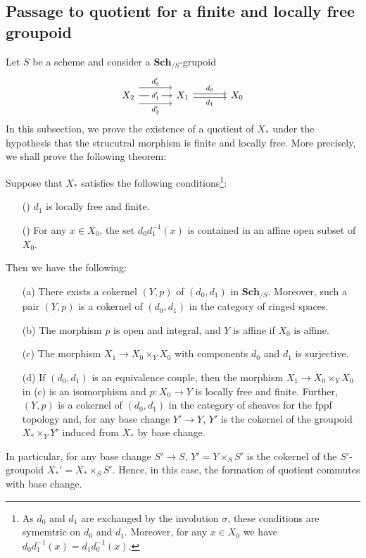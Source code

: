 \subsection{Passage to quotient for a finite and locally free groupoid}
Let $S$ be a scheme and consider a $\mathbf{Sch}_{/S}$-grupoid 
\[\begin{tikzcd}[column sep=12mm]
X_2\ar[r,shift left=8pt,"d_0'"]\ar[r,shift right=8pt,swap,"d_2'"]\ar[r,"d_1'"description]&X_1\ar[r,shift left=2pt,"d_0"]\ar[r,shift right=2pt,swap,"d_1"]&X_0
\end{tikzcd}\]
In this subsection, we prove the existence of a quotient of $X_*$ under the hypothesis that the strucutral morphism is finite and locally free. More precisely, we shall prove the following theorem:
\begin{theorem}\label{scheme groupoid quotient by locally free finite prop}
Suppose that $X_*$ satisfies the following conditions\footnote{As $d_0$ and $d_1$ are exchanged by the involution $\sigma$, these conditions are symemtric on $d_0$ and $d_1$. Moreover, for any $x\in X_0$ we have $d_0d_1^{-1}(x)=d_1d_0^{-1}(x)$.}:
\begin{enumerate}
    \item[(\rmnum{1})] $d_1$ is locally free and finite.
    \item[(\rmnum{2})] For any $x\in X_0$, the set $d_0d_1^{-1}(x)$ is contained in an affine open subset of $X_0$.
\end{enumerate}
Then we have the following:
\begin{enumerate}
    \item[(a)] There exists a cokernel $(Y,p)$ of $(d_0,d_1)$ in $\mathbf{Sch}_{/S}$. Moreover, such a pair $(Y,p)$ is a cokernel of $(d_0,d_1)$ in the category of ringed spaces.
    \item[(b)] The morphism $p$ is open and integral, and $Y$ is affine if $X_0$ is affine.
    \item[(c)] The morphism $X_1\to X_0\times_YX_0$ with components $d_0$ and $d_1$ is surjective.
    \item[(d)] If $(d_0,d_1)$ is an equivalence couple, then the morphism $X_1\to X_0\times_YX_0$ in (c) is an isomorphism and $p:X_0\to Y$ is locally free and finite. Further, $(Y,p)$ is a cokernel of $(d_0,d_1)$ in the category of sheaves for the fppf topology and, for any base change $Y'\to Y$, $Y'$ is the cokernel of the groupoid $X_*\times_YY'$ induced from $X_*$ by base change. 
\end{enumerate}
In particular, for any base change $S'\to S$, $Y'=Y\times_SS'$ is the cokernel of the $S'$-groupoid $X_*'=X_*\times_SS'$. Hence, in this case, the formation of quotient commutes with base change.
\end{theorem}

